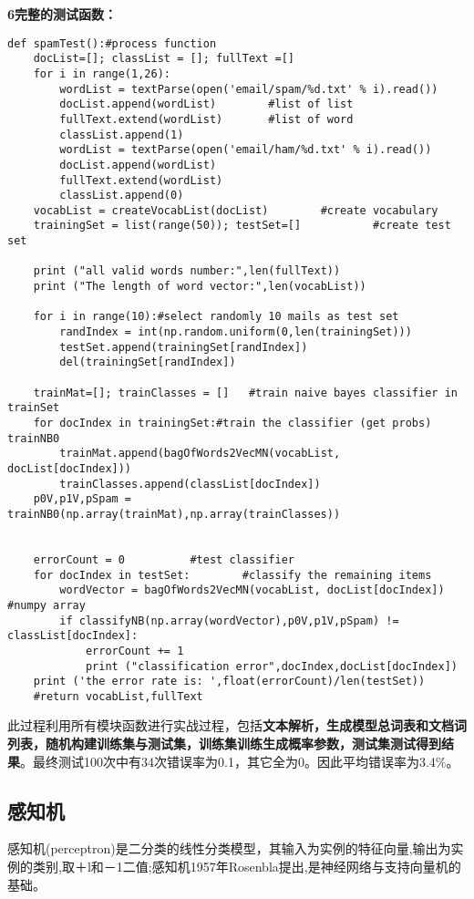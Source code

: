 \noindent\textbf{\textcircled{\footnotesize{6}}完整的测试函数：}
\begin{lstlisting}
def spamTest():#process function
    docList=[]; classList = []; fullText =[]
    for i in range(1,26):
        wordList = textParse(open('email/spam/%d.txt' % i).read())
        docList.append(wordList)        #list of list
        fullText.extend(wordList)       #list of word
        classList.append(1)
        wordList = textParse(open('email/ham/%d.txt' % i).read())
        docList.append(wordList)
        fullText.extend(wordList)
        classList.append(0)
    vocabList = createVocabList(docList)        #create vocabulary
    trainingSet = list(range(50)); testSet=[]           #create test set

    print ("all valid words number:",len(fullText))
    print ("The length of word vector:",len(vocabList))

    for i in range(10):#select randomly 10 mails as test set
        randIndex = int(np.random.uniform(0,len(trainingSet)))
        testSet.append(trainingSet[randIndex])
        del(trainingSet[randIndex])

    trainMat=[]; trainClasses = []   #train naive bayes classifier in trainSet
    for docIndex in trainingSet:#train the classifier (get probs) trainNB0
        trainMat.append(bagOfWords2VecMN(vocabList, docList[docIndex]))
        trainClasses.append(classList[docIndex])
    p0V,p1V,pSpam = trainNB0(np.array(trainMat),np.array(trainClasses))


    errorCount = 0          #test classifier
    for docIndex in testSet:        #classify the remaining items
        wordVector = bagOfWords2VecMN(vocabList, docList[docIndex])   #numpy array
        if classifyNB(np.array(wordVector),p0V,p1V,pSpam) != classList[docIndex]:
            errorCount += 1
            print ("classification error",docIndex,docList[docIndex])
    print ('the error rate is: ',float(errorCount)/len(testSet))
    #return vocabList,fullText
\end{lstlisting}

此过程利用所有模块函数进行实战过程，包括\textbf{文本解析，生成模型总词表和文档词列表，随机构建训练集与测试集，训练集训练生成概率参数，测试集测试得到结果}。最终测试100次中有34次错误率为0.1，其它全为0。因此平均错误率为3.4\%。


\newpage


\subsection{感知机}
感知机(perceptron)是二分类的线性分类模型，其输入为实例的特征向量,输出为实例的类别,取＋l和－1二值;感知机1957年Rosenbla提出,是神经网络与支持向量机的基础。
